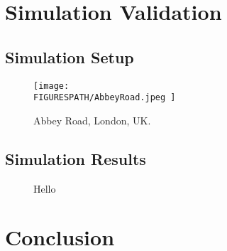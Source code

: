 \documentclass[conference]{IEEEtran}
\newcommand*{\FIGURESPATH}{./figures}
\begin{document}
\section{Simulation Validation}

\subsection{Simulation Setup}

\color{blue}\lipsum[1-2]\color{black}

\begin{figure*}[!t]
	\centering
	\texttt{[image: 
		\\FIGURESPATH/AbbeyRoad.jpeg
		]}
	\caption{
		Abbey Road, London, UK.
	}
	\label{fig:AbbeyRoad}
\end{figure*}

\subsection{Simulation Results}
\color{blue}\lipsum[1-2]\color{black}

\begin{figure}[!t]
    \centering
	\vspace{1mm}
    \caption{
		Hello
	}
	\label{fig:ctrl_result2}
\end{figure}

\section{Conclusion}

\color{blue}\lipsum[1]\color{black}



\end{document}

